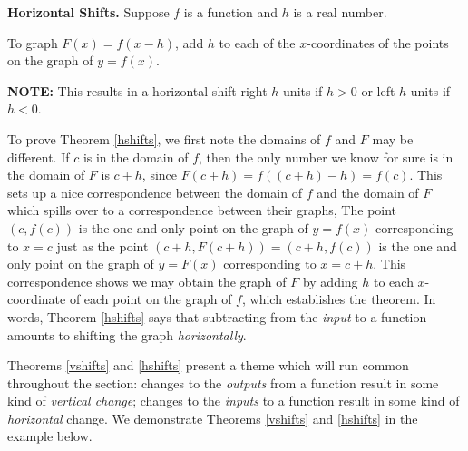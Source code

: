 \begin{mthm} \label{hshifts}\textbf{Horizontal Shifts.}  Suppose $f$ is a function and $h$ is a real number. 

To graph $F(x) = f(x-h)$,  add $h$ to each of the $x$-coordinates of the points on the graph of $y=f(x)$.

\textbf{NOTE:}  This results in a horizontal shift right $h$ units if $h > 0$ or left $h$ units if $h< 0$.

\end{mthm}

To prove Theorem \ref{hshifts}, we first note the domains of $f$ and $F$ may be different.   If $c$ is in the domain of $f$, then the only number we know for sure is in the domain of $F$ is  $c+h$, since $F(c+h) = f((c+h)-h) = f(c)$.  This sets up a nice correspondence between the domain of $f$ and the domain of $F$ which spills over to a correspondence between their graphs,  The point $(c, f(c))$ is the one and only point on the graph of $y = f(x)$ corresponding to $x=c$ just as the point $(c+h, F(c+h)) = (c+h, f(c))$ is the one and only point on the graph of $y = F(x)$ corresponding to $x=c+h$.  This correspondence shows we may obtain the graph of $F$ by adding $h$ to each $x$-coordinate of each point on the graph of $f$, which establishes the theorem. In words, Theorem \ref{hshifts} says that subtracting from the  \textit{input} to a function amounts to shifting the graph \textit{horizontally}. 

 Theorems \ref{vshifts} and \ref{hshifts} present a theme which will run common throughout the section:  changes to the \textit{outputs} from a function result in some kind of \textit{vertical change};  changes to the \textit{inputs} to a function result in some kind of \textit{horizontal} change.  We demonstrate  Theorems \ref{vshifts} and \ref{hshifts} in the example below.
 
